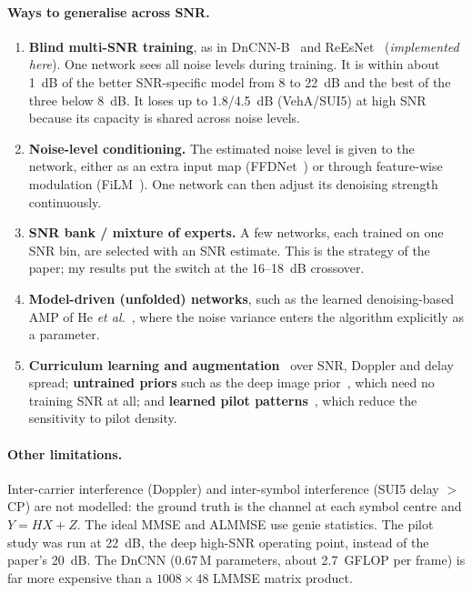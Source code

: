 \documentclass[10pt,a4paper]{article}
\begin{document}
\paragraph{Ways to generalise across SNR.}
\begin{enumerate}
  \item \textbf{Blind multi-SNR training}, as in DnCNN-B~\cite{dncnn} and ReEsNet~\cite{reesnet}
    (\emph{implemented here}). One network sees all noise levels during training. It is within about
    1~dB of the better SNR-specific model from 8 to 22~dB and the best of the three below 8~dB. It
    loses up to 1.8/4.5~dB (VehA/SUI5) at high SNR because its capacity is shared across noise levels.
  \item \textbf{Noise-level conditioning.} The estimated noise level is given to the network, either as
    an extra input map (FFDNet~\cite{ffdnet}) or through feature-wise modulation (FiLM~\cite{film}).
    One network can then adjust its denoising strength continuously.
  \item \textbf{SNR bank / mixture of experts.} A few networks, each trained on one SNR bin, are
    selected with an SNR estimate. This is the strategy of the paper; my results put the switch at
    the 16--18~dB crossover.
  \item \textbf{Model-driven (unfolded) networks}, such as the learned denoising-based AMP of He
    \emph{et al.}~\cite{ldamp}, where the noise variance enters the algorithm explicitly as a parameter.
  \item \textbf{Curriculum learning and augmentation}~\cite{curriculum} over SNR, Doppler and delay
    spread; \textbf{untrained priors} such as the deep image prior~\cite{dip}, which need no training
    SNR at all; and \textbf{learned pilot patterns}~\cite{pilotdesign}, which reduce the sensitivity to
    pilot density.
\end{enumerate}

\paragraph{Other limitations.} Inter-carrier interference (Doppler) and inter-symbol interference
(SUI5 delay $>$ CP) are not modelled: the ground truth is the channel at each symbol centre and
$Y=HX+Z$. The ideal MMSE and ALMMSE use genie statistics. The pilot study was run at 22~dB, the deep
high-SNR operating point, instead of the paper's 20~dB. The DnCNN (0.67\,M parameters, about 2.7~GFLOP
per frame) is far more expensive than a $1008\times48$ LMMSE matrix product.
\end{document}
